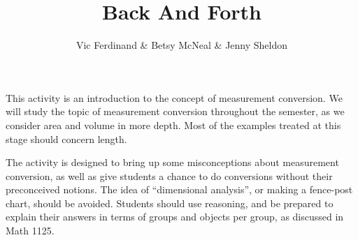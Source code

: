 \documentclass[handout]{ximera}
\title{Back And Forth}
\author{Vic Ferdinand \& Betsy McNeal \& Jenny Sheldon}
\begin{document}
\begin{abstract}\end{abstract}
\maketitle

\begin{instructorIntro}
This activity is an introduction to the concept of measurement conversion.  We will study the topic of measurement conversion throughout the semester, as we consider area and volume in more depth.  Most of the examples treated at this stage should concern length.

The activity is designed to bring up some misconceptions about measurement conversion, as well as give students a chance to do conversions without their preconceived notions.  The idea of ``dimensional analysis'', or making a fence-post chart, should be avoided.  Students should use reasoning, and be prepared to explain their answers in terms of groups and objects per group, as discussed in Math 1125.


\end{instructorIntro}
\end{document}
